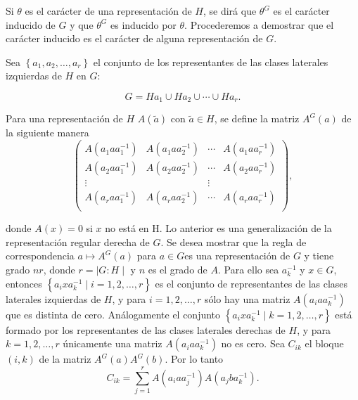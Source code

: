 \documentclass[12pt]{book}
\theoremstyle{definition}
\newcounter{in}
\begin{document}
Si $\theta$ es el carácter de una representación de $H$, se dirá que
$\theta^{G}$ es el carácter inducido de $G$ y que $\theta^{G}$ es
inducido por $\theta$. Procederemos a demostrar que el carácter
inducido es el carácter de alguna representación de $G$.

Sea $\left\{ a_{1}, a_{2},\ldots,a_{r}\right\}$ el conjunto de los
representantes de las clases laterales izquierdas de $H$ en $G$:

\begin{equation}
  \label{eq:61}
  G = Ha_{1} \cup Ha_{2} \cup \cdots \cup Ha_{r}.
\end{equation}

Para una representación de $H$ $A(\tilde{a})$ con $\tilde{a} \in H$,
se define la matriz $A^{G}(a)$ de la siguiente manera
\begin{equation}
  \label{eq:62}
  \begin{pmatrix}
    A(a_{1} a a_{1}^{-1}) & A(a_{1} a a_{2}^{-1}) & \cdots &  A(a_{1} a a_{r}^{-1}) \\
    A(a_{2} a a_{1}^{-1}) & A(a_{2} a a_{2}^{-1}) & \cdots &  A(a_{2} a a_{r}^{-1}) \\
    \vdots &  & \vdots \\
    A(a_{r} a a_{1}^{-1}) & A(a_{r} a a_{2}^{-1}) & \cdots &  A(a_{r} a a_{r}^{-1}) \\
  \end{pmatrix}
  ,
\end{equation}

donde $A(x)=0$ si $x$ no está en H. Lo anterior es una generalización
de la representación regular derecha de $G$. Se desea mostrar que la
regla de correspondencia $a \mapsto A^{G}(a)$ para $a \in G$es una
representación de $G$ y tiene grado $nr$, donde $r= \mid G : H \mid$ y
$n$ es el grado de $A$. Para ello sea $a_{k}^{-1}$ y $x \in G$,
entonces
$\left\{ a_{i} x a_{k}^{-1} \mid i = 1, 2, \ldots, r \right\}$ es el
conjunto de representantes de las clases laterales izquierdas de $H$,
y para $i = 1, 2, \ldots, r$ sólo hay una matriz
$A(a_{i} a a_{k}^{-1})$ que es distinta de cero. Análogamente el
conjunto
$\left\{ a_{i} x a_{k}^{-1} \mid k = 1, 2, \ldots, r \right\}$ está
formado por los representantes de las clases laterales derechas de
$H$, y para $ k = 1, 2, \ldots, r$ únicamente una matriz
$A(a_{i} a a_{k}^{-1})$ no es cero. Sea $C_{ik}$ el bloque $(i,k)$ de
la matriz $A^{G}(a)A^{G}(b)$. Por lo tanto
\begin{equation}
  \label{eq:63}
  C_{ik} = \sum_{j=1}^{r} A(a_{i} a a_{j}^{-1}) A(a_{j} b a_{k}^{-1}).
\end{equation}
\end{document}
